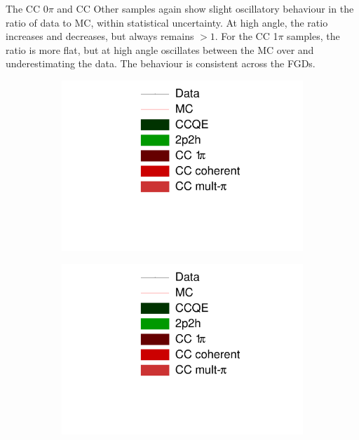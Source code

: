 The CC 0$\pi$ and CC Other samples again show slight oscillatory behaviour in the ratio of data to MC, within statistical uncertainty. At high angle, the ratio increases and decreases, but always remains $>1$. For the CC 1$\pi$ samples,  the ratio is more flat, but at high angle oscillates between the MC over and underestimating the data. The behaviour is consistent across the FGDs.

\begin{figure}[!htbp]
\centering
\begin{subfigure}{.24\textwidth}
  \centering
  \includegraphics[width=\linewidth, trim={5mm 60mm 30mm 0mm}, clip]{figs/legend}
\end{subfigure}
\begin{subfigure}{.24\textwidth}
  \centering
  \includegraphics[width=\linewidth, trim={5mm 0mm 30mm 80mm}, clip]{figs/legend}

\end{subfigure}
\end{figure}

